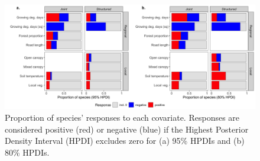 \documentclass[preprint,review,times,12pt,3p]{elsarticle}
\begin{document}
\begin{figure}
	\centering\includegraphics[width=6.5in]{ms/1_Ecography/1/figs/b_opt_bar.png}
	\caption{\label{fig:b_bars} Proportion of species' responses to each covariate. Responses are considered positive (red) or negative (blue) if the Highest Posterior Density Interval (HPDI) excludes zero for (a) 95\% HPDIs and (b) 80\% HPDIs. }
\end{figure}
\end{document}

